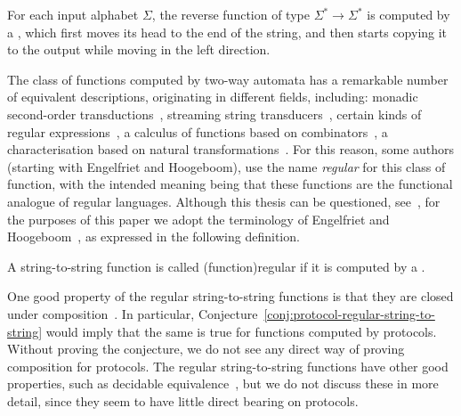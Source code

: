     \begin{myexample}[Reverse]
        For each input alphabet $\Sigma$, the reverse function of type $\Sigma^* \to \Sigma^*$ is computed by a  , which first moves its head to the end of the string, and then starts copying it to the output while moving in the left direction.
    \end{myexample}

    The class of functions computed by two-way automata has a remarkable number
    of equivalent descriptions,  originating in different fields, including:
    monadic second-order transductions~\cite[Section
    4]{engelfrietMSODefinableString2001}, streaming string
    transducers~\cite[Section 3]{alurExpressivenessStreamingString2010},
    certain kinds of regular expressions~\cite[Section 2]{alur2014regular}, a
    calculus of functions based on  combinators~\cite[Theorem
    6.1]{bojanczykRegularFirstOrderList2018}, a characterisation based on
    natural transformations~\cite[Theorem 3.2]{bojanczykTitoRegular23}. For
    this reason, some authors (starting with Engelfriet and Hoogeboom), use the
    name \emph{regular} for this class of function, with the intended meaning
    being that these functions are the functional analogue of regular
    languages. Although this thesis can be questioned,
    see~\cite{polyregular-survey}, for the purposes of this paper we adopt the
    terminology of Engelfriet and
    Hoogeboom~\cite[p.~217]{engelfrietMSODefinableString2001}, as expressed in
    the following definition.


    \begin{definition}
        \label{def:regular-string-to-string}
        A string-to-string function is called \intro(function){regular}
        if it is computed by a .
    \end{definition}
    
    
    One good  property of the regular string-to-string functions is that they
    are closed under composition~\cite[Theorem
    2]{chytilSerialComposition2Way1977}. In particular,
    Conjecture~\ref{conj:protocol-regular-string-to-string} would imply that
    the same is true for functions computed by protocols. Without proving the
    conjecture, we do not see any direct way of proving composition for
    protocols. The  regular string-to-string functions have other good
    properties, such as decidable equivalence~\cite[Theorem
    1]{gurariEquivalenceProblemDeterministic1982}, but we do not discuss these
    in more detail, since they seem to have little direct bearing on protocols.


